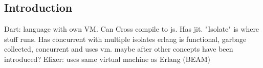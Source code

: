 
\subsection{Introduction}
Dart: language with own VM. Can Cross compile to js. Has jit. "Isolate" is where stuff runs. Has concurrent with multiple isolates
erlang is functional, garbage collected, concurrent and uses vm. maybe after other concepts have been introduced?
Elixer: uses same virtual machine as Erlang (BEAM)

